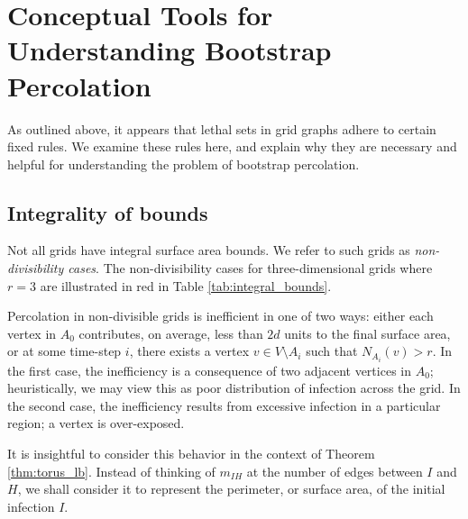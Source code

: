 \section{Conceptual Tools for Understanding Bootstrap Percolation}

As outlined above, it appears that lethal sets in grid graphs adhere to certain fixed rules. We examine these rules here, and explain why they are necessary and helpful for understanding the problem of bootstrap percolation.

\subsection{Integrality of bounds}

Not all grids have integral surface area bounds. We refer to such grids as \emph{non-divisibility cases}. The non-divisibility cases for three-dimensional grids where $r=3$ are illustrated in red in Table \ref{tab:integral_bounds}. 

Percolation in non-divisible grids is inefficient in one of two ways: either each vertex in $A_0$ contributes, on average, less than $2d$ units to the final surface area, or at some time-step $i$, there exists a vertex $v \in V \setminus A_i$ such that $N_{A_i}(v) > r$. In the first case, the inefficiency is a consequence of two adjacent vertices in $A_0$; heuristically, we may view this as poor distribution of infection across the grid. In the second case, the inefficiency results from excessive infection in a particular region; a vertex is over-exposed. 

It is insightful to consider this behavior in the context of Theorem \ref{thm:torus_lb}. Instead of thinking of $m_{IH}$ at the number of edges between $I$ and $H$, we shall consider it to represent the perimeter, or surface area, of the initial infection $I$. 

